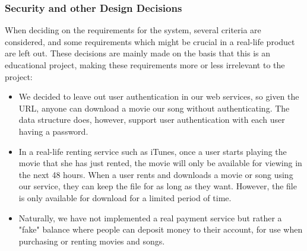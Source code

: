 \subsubsection{Security and other Design Decisions} When deciding on the
requirements for the system, several criteria are considered, and some
requirements which might be crucial in a real-life product are left out. These
decisions are mainly made on the basis that this is an educational project,
making these requirements more or less irrelevant to the project:
\begin{itemize}
\item We decided to leave out user authentication in our web services, so given
	the URL, anyone can download a movie our song without authenticating.
	The data structure does, however, support user authentication with each
	user having a password.
\item In a real-life renting service such as iTunes, once a user starts playing
	the movie that she has just rented, the movie will only be available
	for viewing in the next 48 hours. When a user rents and downloads a
	movie or song using our service, they can keep the file for as long as
	they want. However, the file is only available for download for a
	limited period of time.
\item Naturally, we have not implemented a real payment service but rather a
	"fake" balance where people can deposit money to their account, for use
	when purchasing or renting movies and songs.
\end{itemize}
